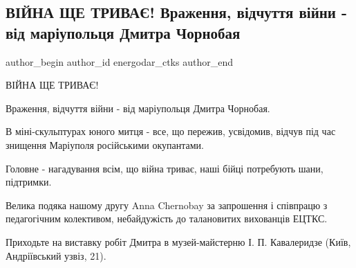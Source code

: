  
 
 
 
 

\subsection{ВІЙНА ЩЕ ТРИВАЄ! Враження, відчуття війни - від маріупольця Дмитра Чорнобая}
\label{sec:01_09_2023.fb.energodar_ctks.1.vijna_sche_tryvaje_vystavka_dmytro_chornobaj}

\ifcmt
 author_begin
   author_id energodar_ctks
 author_end
\fi

ВІЙНА ЩЕ ТРИВАЄ!

Враження, відчуття війни - від маріупольця Дмитра Чорнобая.

В міні-скульптурах юного митця - все, що пережив, усвідомив, відчув під час
знищення Маріуполя російськими окупантами.

Головне - нагадування всім, що війна триває, наші бійці потребують шани,
підтримки.

Велика подяка нашому другу Anna  Chernobay  за запрошення і співпрацю з
педагогічним колективом, небайдужість до талановитих вихованців ЕЦТКС.

Приходьте на виставку робіт Дмитра в музей-майстерню І. П. Кавалеридзе (Київ,
Андріївський узвіз, 21).
